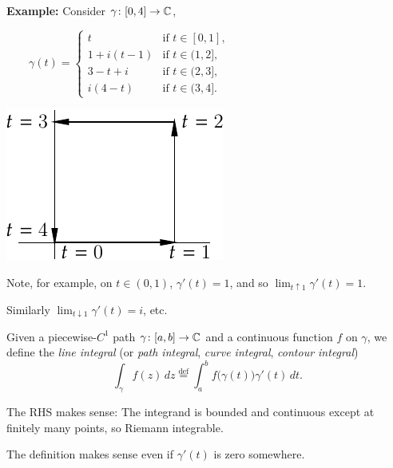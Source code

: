 \documentclass[10pt,aspectratio=169]{beamer}
\begin{document}
\begin{frame}
\textbf{Example:}
Consider $\gamma \colon [0,4] \to {\mathbb{C}}$,

\medskip
$\displaystyle
\qquad
\gamma(t) =
\begin{cases}
t          & \text{if } t \in [0,1],\\
1 + i(t-1) & \text{if } t \in (1,2],\\
3-t + i    & \text{if } t \in (2,3],\\
i(4-t)     & \text{if } t \in (3,4].
\end{cases}
$

\vspace*{-1in}
\hspace*{2.9in}%
\includegraphics{../figures/squarepath}

\hspace*{0.2in}
\pause

Note, for example,
on $t \in (0,1)$, $\gamma'(t) = 1$, and so
$\lim_{t \uparrow 1} \gamma'(t) = 1$.

\medskip
\pause

Similarly
$\lim_{t \downarrow 1} \gamma'(t) = i$, etc.
\end{frame}

\begin{frame}
Given a piecewise-$C^1$ path $\gamma \colon [a,b] \to {\mathbb{C}}$ and a continuous
function $f$ on $\gamma$, 
we define the \emph{line integral} (or 
\emph{path integral}, 
\emph{curve integral},
\emph{contour integral})
\[
\int_{\gamma} f(z) \, dz
\overset{\text{def}}{=}
\int_a^b f\bigl(\gamma(t)\bigr) \gamma'(t) \, dt .
\]
\pause

The RHS makes sense:  The integrand is bounded and continuous except
at finitely many points, so Riemann integrable.

\medskip
\pause

The definition makes sense even if $\gamma'(t)$ is zero somewhere.
\end{frame}
\end{document}
